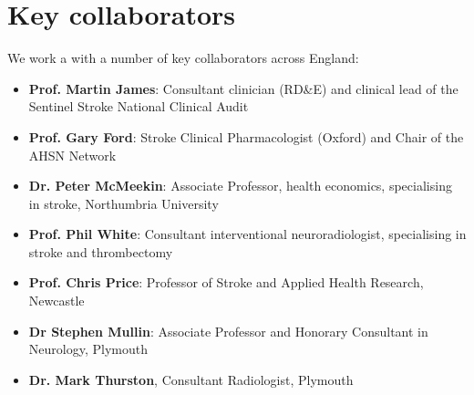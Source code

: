 \section{Key collaborators}

We work a with a number of key collaborators across England:

\begin{itemize}
    \item \textbf{Prof. Martin James}: Consultant clinician (RD\&E) and clinical lead of the Sentinel Stroke National Clinical Audit
    \item \textbf{Prof. Gary Ford}: Stroke Clinical Pharmacologist (Oxford) and Chair of the AHSN Network  
    \item \textbf{Dr. Peter McMeekin}: Associate Professor, health economics, specialising in stroke, Northumbria University
    \item \textbf{Prof. Phil White}: Consultant interventional neuroradiologist, specialising in stroke and thrombectomy
    \item \textbf{Prof. Chris Price}: Professor of Stroke and Applied Health Research, Newcastle
    \item \textbf{Dr Stephen Mullin}: Associate Professor and Honorary Consultant in Neurology, Plymouth
    \item \textbf{Dr. Mark Thurston}, Consultant Radiologist, Plymouth
    

\end{itemize}